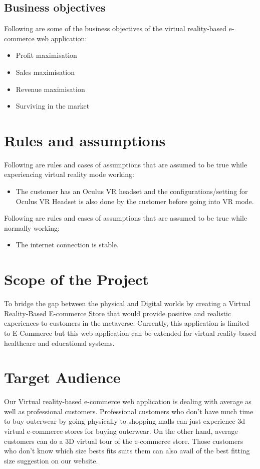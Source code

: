 \subsection{Business objectives}
\justifying
Following are some of the business objectives of the virtual reality-based e-commerce web application:
\begin{itemize}
    \item Profit maximisation
    \item Sales maximisation
    \item Revenue maximisation
    \item Surviving in the market
\end{itemize}
\section{Rules and assumptions}
Following are rules and cases of assumptions that are assumed to be true while experiencing virtual reality mode working:
\begin{itemize}
    \item The customer has an Oculus VR headset and the configurations/setting for Oculus VR Headset is also done by the customer before going into VR mode.
\end{itemize}
Following are rules and cases of assumptions that are assumed to be true while normally working:
\begin{itemize}
    \item The internet connection is stable.
\end{itemize}
\section{Scope of the Project}
\justifying
To bridge the gap between the physical and Digital worlds by creating a Virtual Reality-Based E-commerce Store that would provide positive and realistic experiences to customers in the metaverse. Currently, this application is limited to E-Commerce but this web application can be extended for virtual reality-based healthcare and educational systems.
\section{ Target Audience}
\justifying
Our Virtual reality-based e-commerce web application is dealing with average as well as professional customers. Professional customers who don't have much time to buy outerwear by going physically to shopping malls can just experience 3d virtual e-commerce stores for buying outerwear. On the other hand, average customers can do a 3D virtual tour of the e-commerce store. Those customers who don't know which size bests fits suits them can also avail of the best fitting size suggestion on our website.
